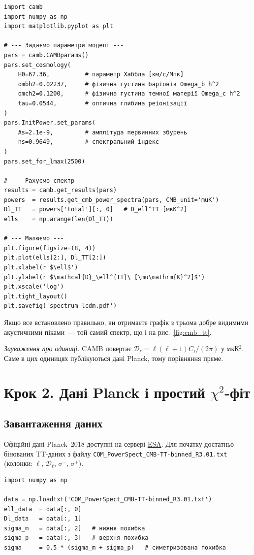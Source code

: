 \begin{verbatim}
import camb
import numpy as np
import matplotlib.pyplot as plt

# --- Задаємо параметри моделі ---
pars = camb.CAMBparams()
pars.set_cosmology(
    H0=67.36,          # параметр Хаббла [км/с/Мпк]
    ombh2=0.02237,     # фізична густина баріонів Omega_b h^2
    omch2=0.1200,      # фізична густина темної матерії Omega_c h^2
    tau=0.0544,        # оптична глибина реіонізації
)
pars.InitPower.set_params(
    As=2.1e-9,         # амплітуда первинних збурень
    ns=0.9649,         # спектральний індекс
)
pars.set_for_lmax(2500)

# --- Рахуємо спектр ---
results = camb.get_results(pars)
powers  = results.get_cmb_power_spectra(pars, CMB_unit='muK')
Dl_TT   = powers['total'][:, 0]   # D_ell^TT [мкК^2]
ells    = np.arange(len(Dl_TT))

# --- Малюємо ---
plt.figure(figsize=(8, 4))
plt.plot(ells[2:], Dl_TT[2:])
plt.xlabel(r'$\ell$')
plt.ylabel(r'$\mathcal{D}_\ell^{TT}\ [\mu\mathrm{K}^2]$')
plt.xscale('log')
plt.tight_layout()
plt.savefig('spectrum_lcdm.pdf')
\end{verbatim}

\noindent
Якщо все встановлено правильно, ви отримаєте графік з трьома
добре видимими акустичними піками~--- той самий спектр, що
і на рис.~\ref{fig:cmb_tt}.

\textit{Зауваження про одиниці.} CAMB повертає
$\mathcal{D}_\ell = \ell(\ell+1)C_\ell/(2\pi)$ у мкК$^2$.
Саме в цих одиницях публікуються дані Planck, тому порівняння
пряме.

\section{Крок 2. Дані Planck і простий $\chi^2$-фіт}

\subsection{Завантаження даних}

Офіційні дані Planck~2018 доступні на сервері \href{https://pla.esac.esa.int/}{ESA}.
Для початку достатньо бінованих TT-даних з файлу
\texttt{COM\_PowerSpect\_CMB-TT-binned\_R3.01.txt}
(колонки: $\ell$, $\mathcal{D}_\ell$, $\sigma^-$, $\sigma^+$).

\begin{verbatim}
import numpy as np

data = np.loadtxt('COM_PowerSpect_CMB-TT-binned_R3.01.txt')
ell_data  = data[:, 0]
Dl_data   = data[:, 1]
sigma_m   = data[:, 2]   # нижня похибка
sigma_p   = data[:, 3]   # верхня похибка
sigma     = 0.5 * (sigma_m + sigma_p)   # симетризована похибка
\end{verbatim}

